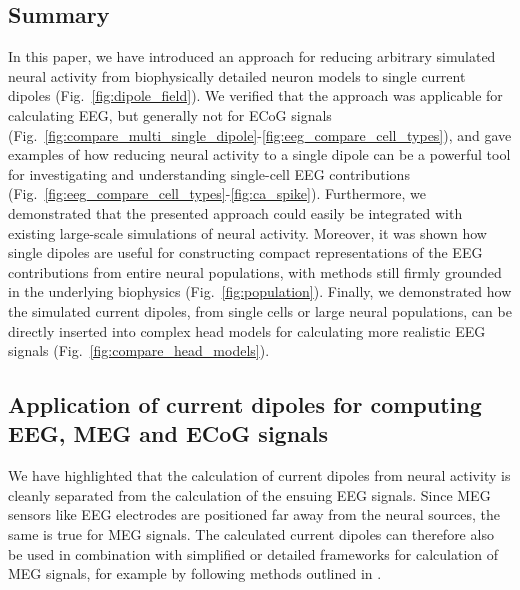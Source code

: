 \documentclass[preprint,10pt,authoryear]{elsarticle}
\newcommand{\hlp}[2][Purple]{ {\sethlcolor{#1} \hl{#2}} }
\newcommand{\gen}[1]{\color{white}{\hlp{GTE: #1 }}\color{black}}
\begin{document}

\subsection{Summary}
In this paper, we have introduced an approach for reducing arbitrary simulated neural activity from biophysically detailed neuron models to single current dipoles (Fig.~\ref{fig:dipole_field}).  
We verified that the approach was applicable for calculating EEG, but generally not for ECoG signals (Fig.~\ref{fig:compare_multi_single_dipole}-\ref{fig:eeg_compare_cell_types}), and gave examples of how reducing neural activity to a single dipole can be a powerful tool for investigating and understanding single-cell EEG contributions (Fig.~\ref{fig:eeg_compare_cell_types}-\ref{fig:ca_spike}). Furthermore, we demonstrated that the presented approach could easily be integrated with existing large-scale simulations of neural activity. Moreover, it was shown how single dipoles are useful for constructing compact representations of the EEG contributions from entire neural populations, with methods still firmly grounded in the underlying biophysics (Fig.~\ref{fig:population}). Finally, we demonstrated how the simulated current dipoles, from single cells or large neural populations, can be directly inserted into complex head models for calculating more realistic EEG signals (Fig.~\ref{fig:compare_head_models}).

\subsection{Application of current dipoles for computing EEG, MEG and ECoG signals}
We have highlighted that the calculation of current dipoles from neural activity is cleanly separated from the calculation of the ensuing EEG signals. 
Since MEG sensors like EEG electrodes are positioned far away from the neural sources, the same is true for MEG signals. The calculated current dipoles can therefore also be used in combination with simplified or detailed frameworks for calculation of MEG signals, for example by following methods outlined in \cite{Ilmoniemi2019}.
\end{document}
